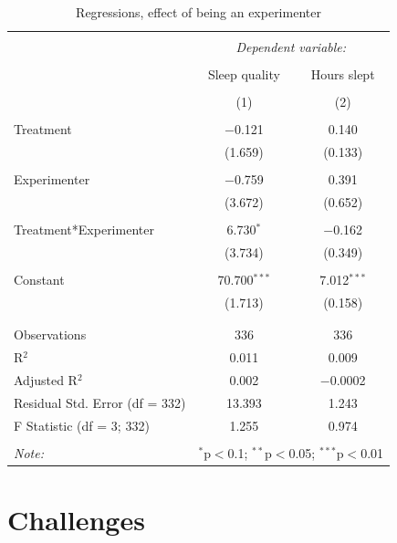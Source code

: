 \documentclass[12pt,]{article}
\begin{document}
\begin{table}[!htbp] \centering 
  \caption{\label{tab:experimenter_regression} Regressions, effect of being an experimenter} 
  \label{} 
\begin{tabular}{@{\extracolsep{5pt}}lcc} 
\\[-1.8ex]\hline 
\hline \\[-1.8ex] 
 & \multicolumn{2}{c}{\textit{Dependent variable:}} \\ 
\cline{2-3} 
\\[-1.8ex] & Sleep quality & Hours slept \\ 
\\[-1.8ex] & (1) & (2)\\ 
\hline \\[-1.8ex] 
 Treatment & $-$0.121 & 0.140 \\ 
  & (1.659) & (0.133) \\ 
  & & \\ 
 Experimenter & $-$0.759 & 0.391 \\ 
  & (3.672) & (0.652) \\ 
  & & \\ 
 Treatment*Experimenter & 6.730$^{*}$ & $-$0.162 \\ 
  & (3.734) & (0.349) \\ 
  & & \\ 
 Constant & 70.700$^{***}$ & 7.012$^{***}$ \\ 
  & (1.713) & (0.158) \\ 
  & & \\ 
\hline \\[-1.8ex] 
Observations & 336 & 336 \\ 
R$^{2}$ & 0.011 & 0.009 \\ 
Adjusted R$^{2}$ & 0.002 & $-$0.0002 \\ 
Residual Std. Error (df = 332) & 13.393 & 1.243 \\ 
F Statistic (df = 3; 332) & 1.255 & 0.974 \\ 
\hline 
\hline \\[-1.8ex] 
\textit{Note:}  & \multicolumn{2}{r}{$^{*}$p$<$0.1; $^{**}$p$<$0.05; $^{***}$p$<$0.01} \\ 
\end{tabular} 
\end{table}

\hypertarget{challenges}{%
\section{Challenges}\label{challenges}}
\end{document}
